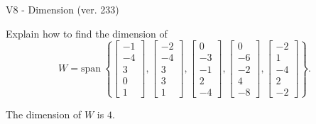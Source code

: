 \begin{exercise}
  \begin{exerciseTitle}V8 - Dimension (ver. 233)\end{exerciseTitle}
  \begin{exerciseStatement}
    Explain how to find the dimension of 
\[W=\mathrm{span}\ \left\{\left[\begin{array}{r}
-1 \\
-4 \\
3 \\
0 \\
1
\end{array}\right] , \left[\begin{array}{r}
-2 \\
-4 \\
3 \\
3 \\
1
\end{array}\right] , \left[\begin{array}{r}
0 \\
-3 \\
-1 \\
2 \\
-4
\end{array}\right] , \left[\begin{array}{r}
0 \\
-6 \\
-2 \\
4 \\
-8
\end{array}\right] , \left[\begin{array}{r}
-2 \\
1 \\
-4 \\
2 \\
-2
\end{array}\right]\right\}.\]



  \end{exerciseStatement}
  \begin{exerciseAnswer}
   The dimension of \(W\) is  \(4\).
  


  \end{exerciseAnswer}
\end{exercise}
